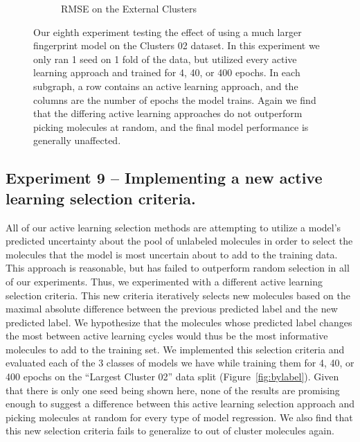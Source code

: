 \documentclass[journal=jmcmar,manuscript=article]{achemso}
\begin{document}
\begin{figure}[tbph]
\begin{subfigure}[b]{0.48\textwidth}
        \caption{RMSE on the External Clusters}
    \end{subfigure}
    \caption{Our eighth experiment testing the effect of using a much larger fingerprint model on the Clusters 02 dataset. In this experiment we only ran 1 seed on 1 fold of the data, but utilized every active learning approach and trained for 4, 40, or 400 epochs. In each subgraph, a row contains an active learning approach, and the columns are the number of epochs the model trains. Again we find that the differing active learning approaches do not outperform picking molecules at random, and the final model performance is generally unaffected.}
    \label{fig:bigmodel}
\end{figure}

\subsection{Experiment 9 -- Implementing a new active learning selection criteria.}

All of our active learning selection methods are attempting to utilize a model's predicted uncertainty about the pool of unlabeled molecules in order to select the molecules that the model is most uncertain about to add to the training data. This approach is reasonable, but has failed to outperform random selection in all of our experiments. Thus, we experimented with a different active learning selection criteria. This new criteria iteratively selects new molecules based on the maximal absolute difference between the previous predicted label and the new predicted label. We hypothesize that the molecules whose predicted label changes the most between active learning cycles would thus be the most informative molecules to add to the training set. We implemented this selection criteria and evaluated each of the 3 classes of models we have while training them for 4, 40, or 400 epochs on the ``Largest Cluster 02'' data split (Figure~\ref{fig:bylabel}). Given that there is only one  seed being shown here, none of the results are promising enough to suggest a difference between this active learning selection approach and picking molecules at random for every type of model regression. We also find that this new selection criteria fails to generalize to out of cluster molecules again.
\end{document}

